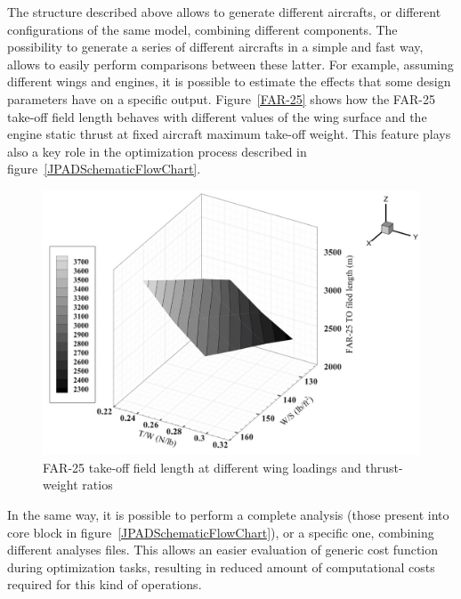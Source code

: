 The structure described above allows to generate different aircrafts, or different configurations of the same model, combining different components. The possibility to generate a series of different aircrafts in a simple and fast way, allows to easily perform comparisons between these latter. For example, assuming different wings and engines, it is possible to estimate the effects that some design parameters have on a specific output. Figure~\vref{FAR-25} shows how the FAR-25 take-off field length behaves with different values of the wing surface and the engine static thrust at fixed aircraft maximum take-off weight. This feature plays also a key role in the optimization process described in figure~\ref{JPADSchematicFlowChart}.

\begin{figure}[htbp] 
\centering
\includegraphics[width=\textwidth]{Immagini/Capitolo1/1_4-FAR-25TakeOffFieldLengthAtDifferentWingLoadingsAndThrustWeightRatios}
\caption[FAR-25 take-off field length at different $W/S_\text W$ and $T/W$] {FAR-25 take-off field length at different wing loadings and thrust-weight ratios}
\label{FAR-25}
\end{figure}

In the same way, it is possible to perform a complete analysis (those present into core block in figure~\ref{JPADSchematicFlowChart}), or a specific one, combining different analyses files. This allows an easier evaluation of generic cost function during optimization tasks, resulting in reduced amount of computational costs required for this kind of operations.

